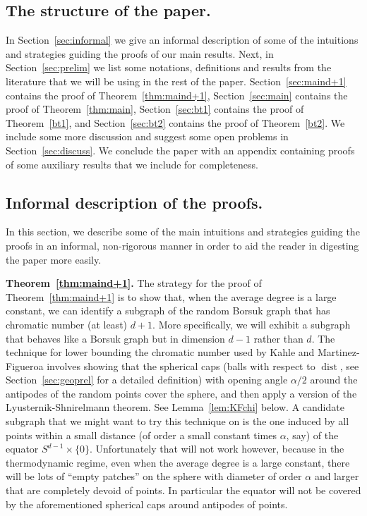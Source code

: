 \documentclass[11pt]{article}%
\DeclareMathOperator{\dist}{dist}
\begin{document}
\subsection{The structure of the paper.}


In Section~\ref{sec:informal} we give an informal description of some of the intuitions and strategies guiding 
the proofs of our main results. 
Next, in Section~\ref{sec:prelim} we list some notations, definitions and results from the literature that we
will be using in the rest of the paper.
Section~\ref{sec:maind+1} contains the proof of Theorem~\ref{thm:maind+1}, Section~\ref{sec:main} contains the proof of
Theorem~\ref{thm:main}, Section~\ref{sec:bt1} contains the proof of Theorem~\ref{bt1}, and Section~\ref{sec:bt2} 
contains the proof of Theorem~\ref{bt2}.
We include some more discussion and suggest some open problems in Section~\ref{sec:discuss}.
We conclude the paper with an appendix containing proofs of some auxiliary results that we include for completeness.


\subsection{Informal description of the proofs.\label{sec:informal}}


In this section, we describe some of the main intuitions and strategies guiding the proofs in an informal, non-rigorous 
manner in order to aid the reader in digesting the paper more easily.

\vspace{1ex}

{\bf Theorem~\ref{thm:maind+1}.} The strategy for the proof of Theorem~\ref{thm:maind+1} is to show that, when the average 
degree is a large constant, we can identify a subgraph of the random Borsuk graph that has chromatic number (at least) $d+1$.
More specifically, we will exhibit a subgraph that behaves like a Borsuk graph but in dimension $d-1$ rather than $d$.
The technique for lower bounding the chromatic number used by Kahle and Martinez-Figueroa involves showing that
the spherical caps (balls with respect to $\dist$, see Section~\ref{sec:geoprel} for a detailed definition)
with opening angle $\alpha/2$ around the antipodes of the random points cover the sphere, and then apply
a version of the Lyusternik-Shnirelmann theorem. See Lemma~\ref{lem:KFchi} below.
A candidate subgraph that we might want to try this technique on is 
the one induced by all points within a small distance (of order a small constant times $\alpha$, say) of the 
equator $S^{d-1} \times \{0\}$. 
Unfortunately that will not work however, because in the thermodynamic regime, even when the 
average degree is a large constant, there will be lots of ``empty patches'' on the sphere 
with diameter of order $\alpha$ and larger that are completely devoid of points. 
In particular the equator will not be covered by the aforementioned spherical caps around antipodes of points.
\end{document}
